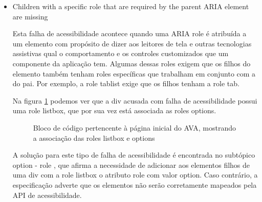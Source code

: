 \documentclass[
	12pt,				%
	openright,			%
	oneside,			%
	a4paper,			%
	chapter=TITLE,		%
	section=TITLE,		%
	subsection=TITLE,	%
	subsubsection=TITLE,%
	english,			%
	brazil				%
	]{abntex2}
\theoremstyle{definition}
\begin{document}
\begin{itemize}
\pagebreak
    
    \item Children with a specific role that are required by the parent ARIA element are missing
    
Esta falha de acessibilidade acontece quando uma ARIA role é atribuída a um elemento com propósito de dizer aos leitores de tela e outras tecnologias assistivas qual o comportamento e os controles customizados que um componente da aplicação tem. Algumas dessas roles exigem que os filhos do elemento também tenham roles específicas que trabalham em conjunto com a do pai. Por exemplo, a role tablist exige que os filhos tenham a role tab.

Na figura \ref{Bloco de código pertencente à página inicial do AVA, mostrando a associação das roles listbox e options} podemos ver que a div acusada com falha de acessibilidade possui uma role listbox, que por sua vez está associada as roles options.

\begin{figure}[!h]
\centering
\caption{Bloco de código pertencente à página inicial do AVA, mostrando a associação das roles listbox e options}
\label{Bloco de código pertencente à página inicial do AVA, mostrando a associação das roles listbox e options}
\end{figure}

A solução para este tipo de falha de acessibilidade é encontrada no subtópico option - role \cite{world2014accessible}, que afirma a necessidade de adicionar aos elementos filhos de uma div com a role listbox o atributo role com valor option. Caso contrário, a especificação adverte que os elementos não serão corretamente mapeados pela API de acessibilidade. 


\end{itemize}
\end{document}
